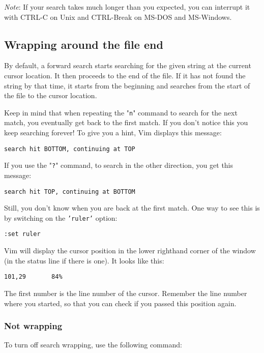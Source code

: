 \emph{Note}: If your search takes much longer than you expected, you can interrupt it with CTRL-C on Unix and  CTRL-Break on MS-DOS and MS-Windows.
\subsection{Wrapping around the file end}
By default, a forward search starts searching for the given string at the current cursor location.
It then proceeds to the end of the file.
If it has not found the string by that time, it starts from the beginning and searches from the start of the file to the cursor location.

Keep in mind that when repeating the "\texttt{n}" command to search for the next match, you eventually get back to the first match.
If you don't notice this you keep searching forever!  To give you a hint, Vim displays this message:

\begin{Verbatim}[samepage=true]
    search hit BOTTOM, continuing at TOP 
\end{Verbatim}

If you use the "\texttt{?}" command, to search in the other direction, you get this message:

\begin{Verbatim}[samepage=true]
    search hit TOP, continuing at BOTTOM 
\end{Verbatim}

Still, you don't know when you are back at the first match.
One way to see this is by switching on the \texttt{'ruler'} option:

\begin{Verbatim}[samepage=true]
 :set ruler
\end{Verbatim}

Vim will display the cursor position in the lower righthand corner of the window (in the status line if there is one).
It looks like this:

\begin{Verbatim}[samepage=true]
    101,29       84% 
\end{Verbatim}

The first number is the line number of the cursor.
Remember the line number where you started, so that you can check if you passed this position again.
\subsubsection{Not wrapping}
To turn off search wrapping, use the following command:

